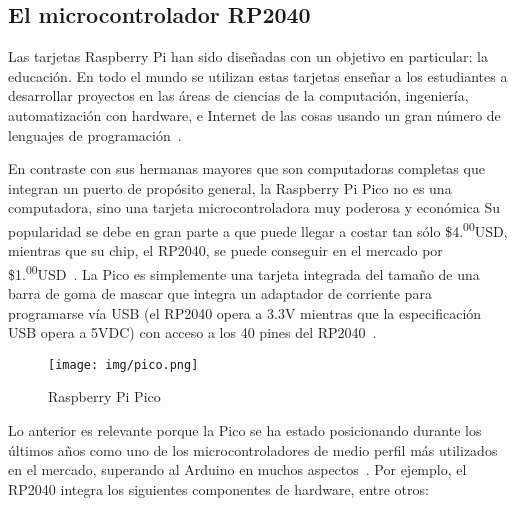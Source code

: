 %
%


\subsection{El microcontrolador RP2040}%
\label{sec:intro-rp2040}
Las tarjetas Raspberry Pi han sido diseñadas con un objetivo en particular: la educación.
En todo el mundo se utilizan estas tarjetas enseñar a los estudiantes a desarrollar proyectos en las áreas de ciencias de la computación, ingeniería, automatización con hardware, e Internet de las cosas usando un gran número de lenguajes de programación~\citep{bell2022,bell2022PiPico}.

En contraste con sus hermanas mayores que son computadoras completas que integran un puerto de propósito general,
la Raspberry Pi Pico no es una computadora, sino una tarjeta microcontroladora muy poderosa y económica
Su popularidad se debe en gran parte a que puede llegar a costar tan sólo \$4.\textsuperscript{00}USD, mientras que su chip,
el RP2040, se puede conseguir en el mercado por \$1.\textsuperscript{00}USD~\citep{bell2022,bell2022PiPico}.
La Pico es simplemente una tarjeta integrada del tamaño de una barra de goma de mascar que integra un adaptador de corriente para programarse vía USB (el RP2040 opera a 3.3V mientras que la especificación USB opera a 5VDC) con acceso a los 40 pines del RP2040~\citep{bell2022,bell2022PiPico}.

\begin{figure}[H]
	\centering
	\texttt{[image: img/pico.png]}
	\caption{Raspberry Pi Pico}%
\end{figure}

Lo anterior es relevante porque la Pico se ha estado posicionando durante los últimos años como uno de los microcontroladores de medio perfil más utilizados en el mercado, superando al Arduino en muchos aspectos~\citep{bell2022,bell2022PiPico}.
Por ejemplo, el RP2040 integra los siguientes componentes de hardware, entre otros:

